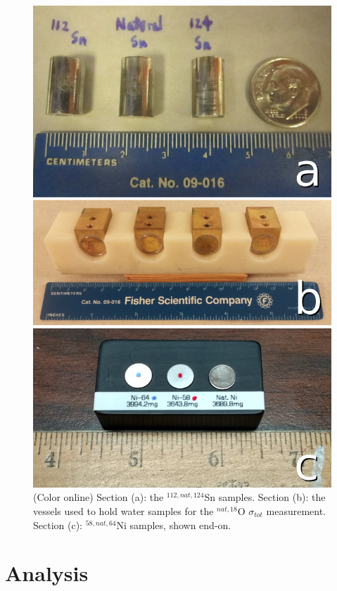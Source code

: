 \documentclass[twocolumn,secnumarabic,amssymb, nobibnotes, aps, prl,
superscriptaddress, nobalancelastpage]{revtex4}
\newcommand{\tots}{\ensuremath{\sigma_{tot}}\,\,}
\begin{document}
\begin{figure}
    \includegraphics[scale=0.23]{figures/AllIsotopicSamples.jpg}
    \caption{(Color online) Section (a): the ${^{112,nat,124}}$Sn samples. Section (b): the 
        vessels used to hold water samples for the ${^{nat, 18}}$O \tots measurement. 
        Section (c): ${^{58,nat,64}}$Ni samples, shown end-on.}
    \label{SamplesImage}
\end{figure}

\section{Analysis}
\end{document}
